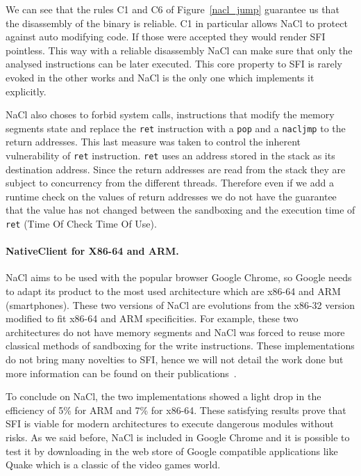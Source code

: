 \documentclass[11pt]{sdm}
\begin{document}
We can see that the rules C1 and C6 of Figure~\ref{nacl_jump} guarantee us that the disassembly of the binary is reliable. C1 in particular allows NaCl to protect against auto modifying code. If those were accepted they would render SFI pointless. This way with a reliable disassembly NaCl can make sure that only the analysed instructions can be later executed. This core property to SFI is rarely evoked in the other works and NaCl is the only one which implements it explicitly.

NaCl also choses to forbid system calls, instructions that modify the memory segments state and replace the \texttt{ret} instruction with a \texttt{pop} and a \texttt{nacljmp} to the return addresses.
This last measure was taken to control the inherent vulnerability of \texttt{ret} instruction. \texttt{ret} uses an address stored in the stack as its destination address. Since the return addresses are read from the stack they are subject to concurrency from the different threads. Therefore even if we add a runtime check on the values of return addresses we do not have the guarantee that the value has not changed between the sandboxing and the execution time of \texttt{ret} (Time Of Check Time Of Use).

\paragraph{NativeClient for X86-64 and ARM.}
\label{par:NativeClient for X86-64 and ARM.}
NaCl aims to be used with the popular browser Google Chrome, so Google needs to adapt its product to the most used architecture which are x86-64 and ARM (smartphones). These two versions of NaCl are evolutions from the x86-32 version modified to fit x86-64 and ARM specificities. For example, these two architectures do not have memory segments and NaCl was forced to reuse more classical methods of sandboxing for the write instructions. These implementations do not bring many novelties to SFI, hence we will not detail the work done but more information can be found on their publications~\cite{Sehr:2010:ASF:1929820.1929822}.

To conclude on NaCl, the two implementations showed a light drop in the efficiency of 5\% for ARM and 7\% for x86-64. These satisfying results prove that SFI is viable for modern architectures to execute dangerous modules without risks. As we said before, NaCl is included in Google Chrome and it is possible to test it by downloading in the web store of Google compatible applications like Quake which is a classic of the video games world.
\end{document}
